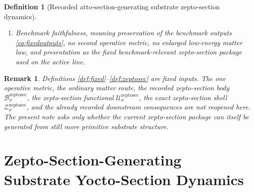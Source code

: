 \documentclass[11pt]{article}
\newcommand{\AttoSectionShell}[1]{\mathcal Z_{#1}^{\mathrm{attosec}}}
\newcommand{\ZeptoSectionBody}[1]{\mathcal B_{#1}^{\mathrm{zeptosec}}}
\newcommand{\ZeptoSectionProj}[1]{\Pi_{#1}^{\mathrm{zeptosec}}}
\newcommand{\ZeptoSectionFiber}[2]{\mathcal F_{#1}^{\mathrm{zeptosec}}(#2)}
\newcommand{\ZeptoSectionFunctional}[1]{\mathscr U_{#1}^{\mathrm{zeptosec}}}
\newcommand{\ZeptoSectionShell}[1]{\mathcal Z_{#1}^{\mathrm{zeptosec}}}
\newtheorem{definition}{Definition}
\newtheorem{remark}{Remark}
\begin{document}
\begin{definition}[Recorded atto-section-generating substrate zepto-section dynamics]
\begin{enumerate}
\[\begin{array}{l}
    \ZeptoSectionFunctional{\sigma}(q)
    =
    \displaystyle\min_{r\in\ZeptoSectionFiber{\sigma}{\ZeptoSectionProj{\sigma}(q)}}
    \ZeptoSectionFunctional{\sigma}(r)
    \end{array}
    \right\},
    \]
    and
    \[
    \ZeptoSectionProj{\sigma}\big|_{\ZeptoSectionShell{\sigma}}
    :
    \ZeptoSectionShell{\sigma}
    \xrightarrow{\cong}\AttoSectionShell{\sigma}
    \]
    is a diffeomorphism.
    \item Benchmark faithfulness, meaning preservation of the benchmark outputs \eqref{eq:fixedoutputs}, no second operative metric, no enlarged low-energy matter law, and presentation as the fixed benchmark-relevant zepto-section package used on the active line.
\end{enumerate}
\end{definition}

\begin{remark}
Definitions \ref{def:fixed}--\ref{def:zeptosec} are fixed inputs. The one operative metric, the ordinary matter route, the recorded zepto-section body \(\ZeptoSectionBody{\sigma}\), the zepto-section functional \(\ZeptoSectionFunctional{\sigma}\), the exact zepto-section shell \(\ZeptoSectionShell{\sigma}\), and the already recorded downstream consequences are not reopened here. The present note asks only whether the current zepto-section package can itself be generated from still more primitive substrate structure.
\end{remark}

\section{Zepto-Section-Generating Substrate Yocto-Section Dynamics}
\end{document}
